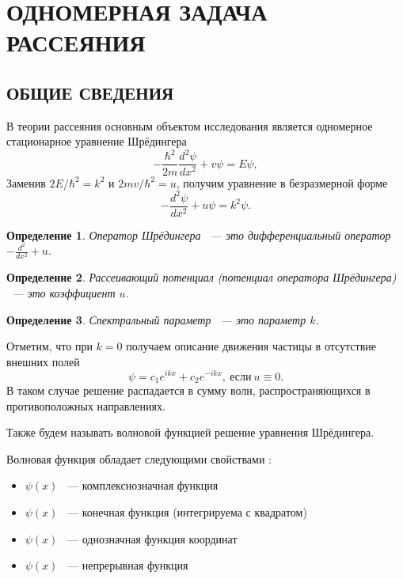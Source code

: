 \documentclass[a4 paper, 12 pt]{extarticle}
\newtheorem{Def}{Определение}[section]
\begin{document}
	
	\newpage
	\section{ОДНОМЕРНАЯ ЗАДАЧА РАССЕЯНИЯ}
	\subsection{ОБЩИЕ СВЕДЕНИЯ}
	В теории рассеяния 
	основным объектом исследования является одномерное стационарное уравнение Шрёдингера
   \begin{equation*}
   -\frac{\hbar^2}{2m}\frac{d^2\psi}{d x^2}+v\psi=E\psi,
   \end{equation*}
   Заменив $2E/\hbar^2=k^2$ и $2mv/\hbar^2=u$, получим уравнение в безразмерной форме
   \begin{equation}\label{Schred1D}
   -\frac{d^2\psi}{d x^2}+u\psi=k^2\psi.
   \end{equation}
   
   \begin{Def}
   	Оператор Шрёдингера ~--- это дифференциальный оператор \newline  $-\frac{d^2}{d x^2}+u$.
   \end{Def}

   \begin{Def}
   	Рассеивающий потенциал (потенциал оператора Шрёдингера) ~--- это коэффициент $u$.
   \end{Def}

   \begin{Def}
    Спектральный параметр ~--- это параметр $k$.
   \end{Def}
	Отметим, что при $k=0$ получаем описание движения частицы в отсутствие внешних полей
	\begin{equation*}
	\psi=c_1e^{ikx}+c_2e^{-ikx}, \ \text{если} \ u\equiv0.
	\end{equation*}
	В таком случае решение распадается в сумму волн, распространяющихся в противоположных направлениях.
	
    Также будем называть волновой функцией решение уравнения Шрёдингера.
    
    Волновая функция обладает следующими свойствами \cite{Peisakhovich, Landau}:
    \begin{itemize}
    	\item $\psi\left(x\right)$ ~--- комплекснозначная функция
    	\item $\psi\left(x\right)$ ~--- конечная функция (интегрируема с квадратом)
    	\item $\psi\left(x\right)$ ~--- однозначная функция координат
    	\item $\psi\left(x\right)$ ~--- непрерывная функция
    \end{itemize}
\end{document}
